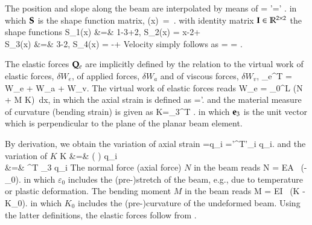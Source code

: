     The position and slope along the beam are interpolated by means of 
    \be
      \rv = \Sm \qv \qquad {} \qquad \rv'=\Sm' \qv.
    \ee
    in which $\mathbf{S}$ is the shape function matrix,
    \be
      \Sm(x)\, =\, \left[\, S_1(x)\,\Im\;\; S_2(x)\,\Im\;\; S_3(x)\,\Im\;\; S_4(x)\,\Im\, \right].
    \ee
    with identity matrix $\mathbf{I} \in \mathbb{R}^{2 \times 2}$ the shape functions
    \bea \label{eq:cable2D:shapeFunctions}
      S_1(x) &=& 1-3+2, \quad
      S_2(x) = x-2+\nonumber\\
      S_3(x) &=& 3-2, \; \; \; \; \; \;  \quad
      S_4(x) = -+
    \eea
    Velocity simply follows as 
    \be
       = \dot \rv = \Sm \dot \qv.
    \ee
    
    The elastic forces $\mathbf{Q}_e$ are implicitly defined by the relation to the 
    virtual work of elastic forces, $\delta W_e$, of applied forces, $\delta W_a$ and of viscous forces, $\delta W_v$, 
    \be \label{eq:cable2D:elasticForces}
      \Qm_e^T \delta \qv = \delta W_e + \delta W_a + \delta W_v.
    \ee
    The virtual work of elastic forces reads
    \be
      \delta W_e = \int_0^L (N \delta \varepsilon + M \delta K) \,dx,
    \ee
    in which the axial strain is defined as \cite{GerstmayrIrschik2008}
    \be
      \varepsilon=\Vert \rv'.
    \ee 
    and the material measure of curvature (bending strain) is given as
    \be
    	K=\ev_3^T  .
    \ee
    in which $\mathbf{e}_3$ is the unit vector which is perpendicular to the plane of the planar beam element.
    
    By derivation, we obtain the variation of axial strain
    \be \label{eq:cable2D:deltaEpsilon}
    \delta \varepsilon =\delta q_i
    	=\rv'^{T}\Sm'_i \delta q_i.
    \ee
    and the variation of $K$
    \bea \label{eq:cable2D:deltaKappa}
    \delta K &=&  \left( \right) \delta q_i\nonumber\\
       &=&  ^{T} \ev_3 \delta q_i
    \eea
    The normal force (axial force) $N$ in the beam reads
    \be \label{eq_N}
      N = EA \, (\varepsilon - \varepsilon_0).
    \ee
    in which $\varepsilon_0$ includes the (pre-)stretch of the beam, e.g., due to temperature or plastic deformation.
    The bending moment $M$ in the beam reads
    \be \label{eq_M}
      M = EI \, (K - K_0).
    \ee
    in which $K_0$ includes the (pre-)curvature of the undeformed beam.
    Using the latter definitions, the elastic forces follow from .
    
